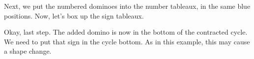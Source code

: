 \documentclass[12pt]{article}
\numberwithin{equation}{section}
\newcommand{\horizontalDominoMaybe}[3]{\filldraw [dominoMaybeStyle] (#2 - 1 + \eps, #1 - 1 + \eps) rectangle + (2 - \teps, 1 -\teps) node [dominoText] {$#3$};}
\newcommand{\horizontalDominoMaybeShift}[4]{\filldraw [dominoMaybeStyle] (#2 - 1 + #4 + \eps, #1 - 1 + \eps) rectangle + (2 - \teps, 1 -\teps) node [dominoText] {$#3$};}
\newcommand{\verticalDominoMaybeShift}[4]{\filldraw [dominoMaybeStyle] (#2 - 1 + #4 + \eps,  #1 - 1 + \eps) rectangle + (1 - \teps,2 -\teps) node [dominoText] {$#3$};}
\begin{document}
\begin{itemize}
\begin{itemize}
\begin{figure}[H]
      \end{figure}
      Next, we put the numbered dominoes into the number tableaux, in the same blue positions.
      Now, let's box up the sign tableaux.
      \begin{figure}[H]
        \centering
      \end{figure}

      Okay, last step.  The added domino is now in the bottom of the contracted cycle.
      We need to put that sign in the cycle bottom.
      As in this example, this may cause a shape change.
      \begin{figure}[H]
        \centering
      \end{figure}


\end{itemize}
\end{itemize}
\end{document}
